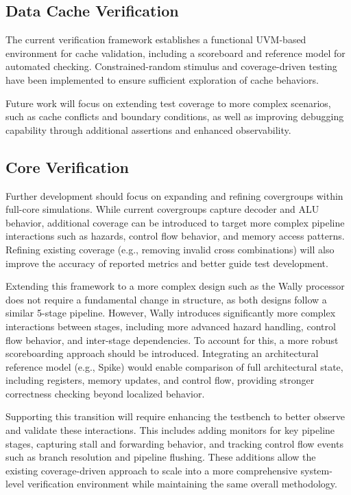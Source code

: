 \documentclass[conference]{IEEEtran}
\begin{document}
    \subsection{Data Cache Verification}
        The current verification framework establishes a functional UVM-based environment for cache validation, including a scoreboard and reference model for automated checking. Constrained-random stimulus and coverage-driven testing have been implemented to ensure sufficient exploration of cache behaviors.
        
        Future work will focus on extending test coverage to more complex scenarios, such as cache conflicts and boundary conditions, as well as improving debugging capability through additional assertions and enhanced observability.
    \subsection{Core Verification}
        Further development should focus on expanding and refining covergroups within full-core simulations. While current covergroups capture decoder and ALU behavior, additional coverage can be introduced to target more complex pipeline interactions such as hazards, control flow behavior, and memory access patterns. Refining existing coverage (e.g., removing invalid cross combinations) will also improve the accuracy of reported metrics and better guide test development.
        
        Extending this framework to a more complex design such as the Wally processor does not require a fundamental change in structure, as both designs follow a similar 5-stage pipeline. However, Wally introduces significantly more complex interactions between stages, including more advanced hazard handling, control flow behavior, and inter-stage dependencies. To account for this, a more robust scoreboarding approach should be introduced. Integrating an architectural reference model (e.g., Spike) would enable comparison of full architectural state, including registers, memory updates, and control flow, providing stronger correctness checking beyond localized behavior.
        
        Supporting this transition will require enhancing the testbench to better observe and validate these interactions. This includes adding monitors for key pipeline stages, capturing stall and forwarding behavior, and tracking control flow events such as branch resolution and pipeline flushing. These additions allow the existing coverage-driven approach to scale into a more comprehensive system-level verification environment while maintaining the same overall methodology.
\end{document}
